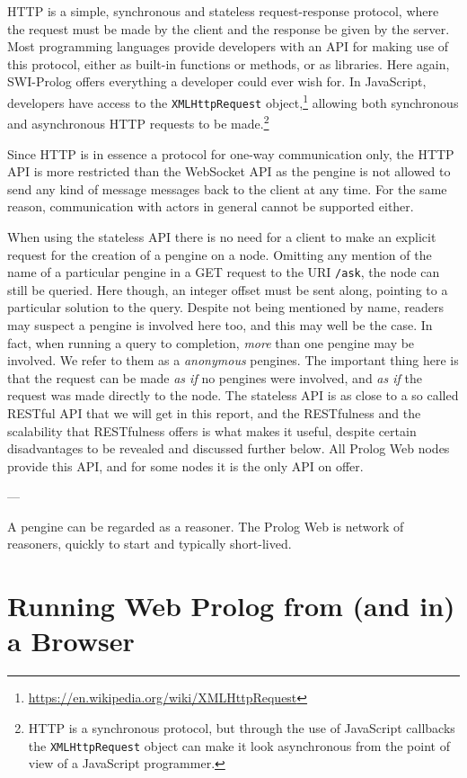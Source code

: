 \documentclass{tlp}
\begin{document}
HTTP is a simple, synchronous and stateless request-response protocol, where the request must be made by the client and the response be given by the server. Most programming languages provide developers with an API for making use of this protocol, either as built-in functions or methods, or as libraries. Here again, SWI-Prolog offers everything a developer could ever wish for. In JavaScript, developers have access to the \texttt{XMLHttpRequest} object,\footnote{\url{https://en.wikipedia.org/wiki/XMLHttpRequest}} allowing both synchronous and asynchronous HTTP requests to be made.\footnote{HTTP is a synchronous protocol, but through the use of JavaScript callbacks the \texttt{XMLHttpRequest} object can make it look asynchronous from the point of view of a JavaScript programmer.} 

Since HTTP is in essence a protocol for one-way communication only, the HTTP API is more restricted than the WebSocket API as the pengine is not allowed to send any kind of message messages back to the client at any time. For the same reason, communication with actors in general cannot be supported either.

When using the stateless API there is no need for a client to make an explicit request for the creation of a pengine on a node. Omitting any mention of the name of a particular pengine in a GET request to the URI \texttt{/ask}, the node can still be queried. Here though, an integer offset must be sent along, pointing to a particular solution to the query. Despite not being mentioned by name, readers may suspect a pengine is involved here too, and this may well be the case. In fact, when running a query to completion, \textit{more} than one pengine may be involved. We refer to them as a \textit{anonymous} pengines. The important thing here is that the request can be made \textit{as if} no pengines were involved, and \textit{as if} the request was made directly to the node. The stateless API is as close to a so called RESTful API that we will get in this report, and the RESTfulness and the scalability that RESTfulness offers is what makes it useful, despite certain disadvantages to be revealed and discussed further below. All Prolog Web nodes provide this API, and for some nodes it is the only API on offer.

---

A pengine can be regarded as a reasoner. The Prolog Web is network of reasoners, quickly to start and typically short-lived.

\section{Running Web Prolog from (and in) a Browser}\label{sec:browser}
\end{document}
